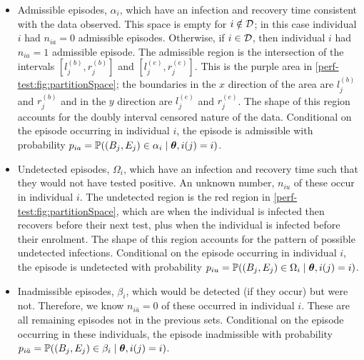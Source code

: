 \documentclass[thesis.tex]{subfiles}
\begin{document}
\begin{itemize}
\item
  Admissible episodes, $\alpha_i$, which have an infection and recovery time consistent with the data observed.
  This space is empty for $i \notin \mathcal{D}$; in this case individual $i$ had $n_{ia} = 0$ admissible episodes.
  Otherwise, if $i \in \mathcal{D}$, then individual $i$ had $n_{ia} =1$ admissible episode.
  The admissible region is the intersection of the intervals $[l_j^{(b)}, r_j^{(b)}]$ and $[l_j^{(e)}, r_j^{(e)}]$.
  This is the purple area in \cref{perf-test:fig:partitionSpace}; the boundaries in the $x$ direction of the area are $l_j^{(b)}$ and $r_j^{(b)}$ and in the $y$ direction are $l_j^{(e)}$ and $r_j^{(e)}$.
  The shape of this region accounts for the doubly interval censored nature of the data.
  Conditional on the episode occurring in individual $i$, the episode is admissible with probability $p_{ia} = \operatorname{\mathbb{P}}((B_j, E_j) \in \alpha_i \mid \bm{\theta}, i(j) = i)$.
  \label{perf-test:def:admissible}
\item
  Undetected episodes, $\Omega_i$, which have an infection and recovery time such that they would not have tested positive.
  An unknown number, $n_{iu}$ of these occur in individual $i$.
  The undetected region is the red region in \cref{perf-test:fig:partitionSpace}, which are when the individual is infected then recovers before their next test, plus when the individual is infected before their enrolment.
  The shape of this region accounts for the pattern of possible undetected infections.
  Conditional on the episode occurring in individual $i$, the episode is undetected with probability $p_{iu} = \operatorname{\mathbb{P}}((B_j, E_j) \in \Omega_i \mid \bm{\theta}, i(j) = i)$.
\item
  Inadmissible episodes, $\beta_i$, which would be detected (if they occur) but were not.
  Therefore, we know $n_{i\bar{a}} = 0$ of these occurred in individual $i$.
  These are all remaining episodes not in the previous sets.
  Conditional on the episode occurring in these individuals, the episode inadmissible with probability $p_{i\bar{a}} = \operatorname{\mathbb{P}}((B_j, E_j) \in \beta_i \mid \bm{\theta}, i(j) = i)$.
\end{itemize}
\end{document}
